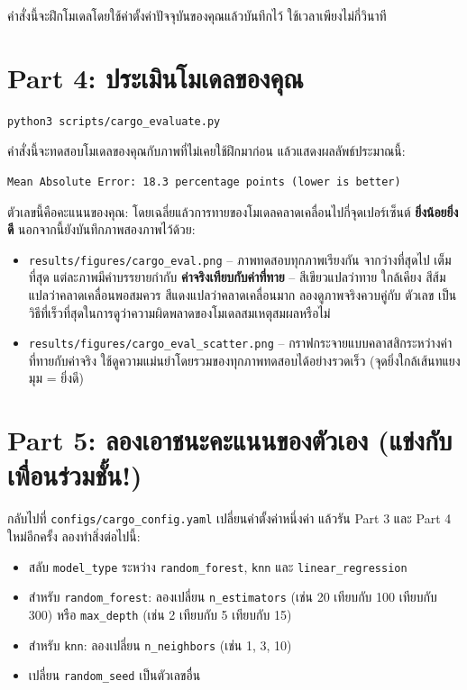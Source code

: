 \documentclass[11pt]{article}
\begin{document}
คำสั่งนี้จะฝึกโมเดลโดยใช้ค่าตั้งค่าปัจจุบันของคุณแล้วบันทึกไว้ ใช้เวลาเพียงไม่กี่วินาที

\section*{Part 4: ประเมินโมเดลของคุณ}
\begin{lstlisting}
python3 scripts/cargo_evaluate.py
\end{lstlisting}

คำสั่งนี้จะทดสอบโมเดลของคุณกับภาพที่ไม่เคยใช้ฝึกมาก่อน แล้วแสดงผลลัพธ์ประมาณนี้:

\begin{lstlisting}
Mean Absolute Error: 18.3 percentage points (lower is better)
\end{lstlisting}

ตัวเลขนี้คือคะแนนของคุณ: โดยเฉลี่ยแล้วการทายของโมเดลคลาดเคลื่อนไปกี่จุดเปอร์เซ็นต์
\textbf{ยิ่งน้อยยิ่งดี} นอกจากนี้ยังบันทึกภาพสองภาพไว้ด้วย:
\begin{itemize}
  \item \texttt{results/figures/cargo\_eval.png} -- ภาพทดสอบทุกภาพเรียงกัน จากว่างที่สุดไป
  เต็มที่สุด แต่ละภาพมีคำบรรยายกำกับ \textbf{ค่าจริงเทียบกับค่าที่ทาย} -- สีเขียวแปลว่าทาย
  ใกล้เคียง สีส้มแปลว่าคลาดเคลื่อนพอสมควร สีแดงแปลว่าคลาดเคลื่อนมาก ลองดูภาพจริงควบคู่กับ
  ตัวเลข เป็นวิธีที่เร็วที่สุดในการดูว่าความผิดพลาดของโมเดลสมเหตุสมผลหรือไม่
  \item \texttt{results/figures/cargo\_eval\_scatter.png} -- กราฟกระจายแบบคลาสสิกระหว่างค่า
  ที่ทายกับค่าจริง ใช้ดูความแม่นยำโดยรวมของทุกภาพทดสอบได้อย่างรวดเร็ว (จุดยิ่งใกล้เส้นทแยงมุม
  = ยิ่งดี)
\end{itemize}

\section*{Part 5: ลองเอาชนะคะแนนของตัวเอง (แข่งกับเพื่อนร่วมชั้น!)}
กลับไปที่ \texttt{configs/cargo\_config.yaml} เปลี่ยนค่าตั้งค่าหนึ่งค่า แล้วรัน Part 3 และ
Part 4 ใหม่อีกครั้ง ลองทำสิ่งต่อไปนี้:
\begin{itemize}
  \item สลับ \texttt{model\_type} ระหว่าง \texttt{random\_forest}, \texttt{knn} และ \texttt{linear\_regression}
  \item สำหรับ \texttt{random\_forest}: ลองเปลี่ยน \texttt{n\_estimators} (เช่น 20 เทียบกับ 100 เทียบกับ 300) หรือ \texttt{max\_depth} (เช่น 2 เทียบกับ 5 เทียบกับ 15)
  \item สำหรับ \texttt{knn}: ลองเปลี่ยน \texttt{n\_neighbors} (เช่น 1, 3, 10)
  \item เปลี่ยน \texttt{random\_seed} เป็นตัวเลขอื่น
\end{itemize}
\end{document}
